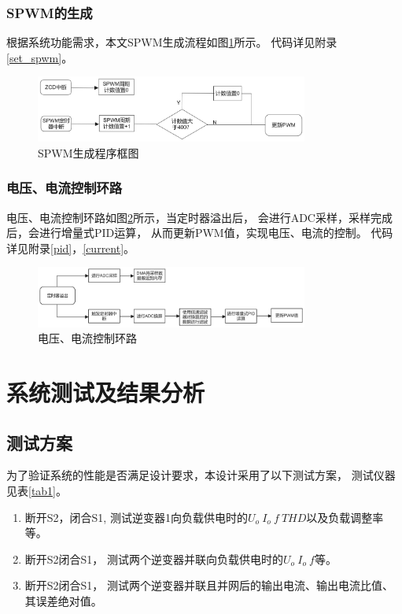\documentclass[a4paper,12pt]{article}
\begin{document}
\subsubsection{SPWM的生成}
根据系统功能需求，本文SPWM生成流程如图\ref{fig12}所示。
代码详见附录\ref{set_spwm}。
\begin{figure}[H]
    \centering
    \includegraphics[width=0.8\textwidth]{src/fig12.png}
    \caption{SPWM生成程序框图}
    \label{fig12}
\end{figure}

\subsubsection{电压、电流控制环路}
电压、电流控制环路如图\ref{fig3}所示，当定时器溢出后，
会进行ADC采样，采样完成后，会进行增量式PID运算，
从而更新PWM值，实现电压、电流的控制。
代码详见附录\ref{pid}，\ref{current}。
\begin{figure}[H]
    \centering
    \includegraphics[width=0.8\textwidth]{src/fig3.png}
    \caption{电压、电流控制环路}
    \label{fig3}
\end{figure}

\section{系统测试及结果分析}

\subsection{测试方案}
为了验证系统的性能是否满足设计要求，本设计采用了以下测试方案，
测试仪器见表\ref{tab1}。
\begin{enumerate}
    \item 断开S2，闭合S1,
    测试逆变器1向负载供电时的$U_o\ I_o\ f\ THD$以及负载调整率等。
    \item 断开S2闭合S1，
    测试两个逆变器并联向负载供电时的$U_o\   I_o\   f$等。
    \item 断开S2闭合S1，
    测试两个逆变器并联且并网后的输出电流、输出电流比值、
    其误差绝对值。
\end{enumerate}
\end{document}

